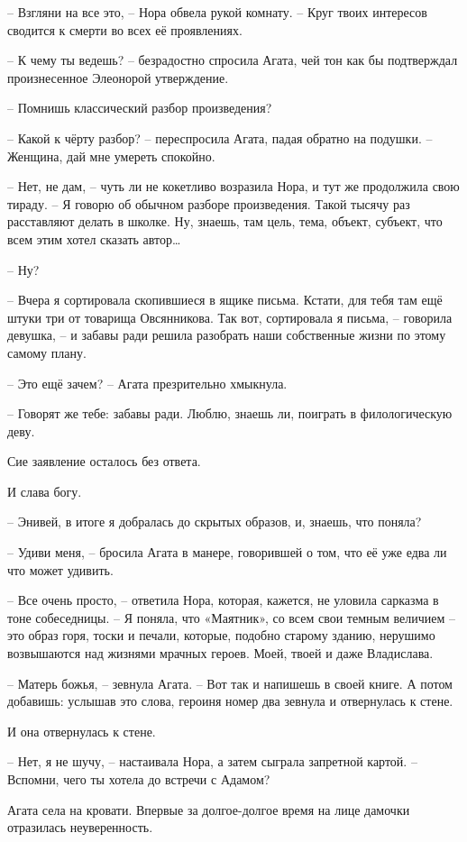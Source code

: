 \documentclass[
  a5paperpaper,
  DIV=11,
  numbers=noendperiod]{scrreprt}
\begin{document}
-- Взгляни на все это, -- Нора обвела рукой комнату. -- Круг твоих
интересов сводится к смерти во всех её проявлениях.

-- К чему ты ведешь? -- безрадостно спросила Агата, чей тон как бы
подтверждал произнесенное Элеонорой утверждение.

-- Помнишь классический разбор произведения?

-- Какой к чёрту разбор? -- переспросила Агата, падая обратно на
подушки. -- Женщина, дай мне умереть спокойно.

-- Нет, не дам, -- чуть ли не кокетливо возразила Нора, и тут же
продолжила свою тираду. -- Я говорю об обычном разборе произведения.
Такой тысячу раз расставляют делать в школке. Ну, знаешь, там цель,
тема, объект, субъект, что всем этим хотел сказать автор\ldots{}

-- Ну?

-- Вчера я сортировала скопившиеся в ящике письма. Кстати, для тебя там
ещё штуки три от товарища Овсянникова. Так вот, сортировала я письма, --
говорила девушка, -- и забавы ради решила разобрать наши собственные
жизни по этому самому плану.

-- Это ещё зачем? -- Агата презрительно хмыкнула.

-- Говорят же тебе: забавы ради. Люблю, знаешь ли, поиграть в
филологическую деву.

Сие заявление осталось без ответа.

И слава богу.

-- Энивей, в итоге я добралась до скрытых образов, и, знаешь, что
поняла?

-- Удиви меня, -- бросила Агата в манере, говорившей о том, что её уже
едва ли что может удивить.

-- Все очень просто, -- ответила Нора, которая, кажется, не уловила
сарказма в тоне собеседницы. -- Я поняла, что «Маятник», со всем свои
темным величием -- это образ горя, тоски и печали, которые, подобно
старому зданию, нерушимо возвышаются над жизнями мрачных героев. Моей,
твоей и даже Владислава.

-- Матерь божья, -- зевнула Агата. -- Вот так и напишешь в своей книге.
А потом добавишь: услышав это слова, героиня номер два зевнула и
отвернулась к стене.

И она отвернулась к стене.

-- Нет, я не шучу, -- настаивала Нора, а затем сыграла запретной картой.
-- Вспомни, чего ты хотела до встречи с Адамом?

Агата села на кровати. Впервые за долгое-долгое время на лице дамочки
отразилась неуверенность.
\end{document}
